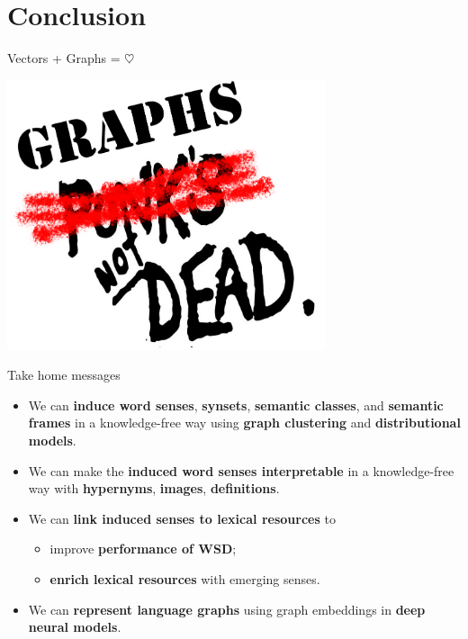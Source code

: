 
\section{Conclusion}


\begin{frame}{Vectors + Graphs = $\heartsuit$ }

\begin{center}
\includegraphics[width=0.7\textwidth]{figures/graphs}	
\end{center}

\end{frame}

\begin{frame}{Take home messages}

\begin{itemize}
	\item We can \alert{\textbf{induce word senses}}, \alert{\textbf{synsets}}, \alert{\textbf{semantic classes}}, and \textbf{\alert{semantic frames}} in a knowledge-free way using \textbf{graph clustering} and \textbf{distributional models}.
    \vspace{1em}
    \pause
    
	\item We can make the \alert{\textbf{induced word senses interpretable}} in a knowledge-free way with \textbf{hypernyms}, \textbf{images},  \textbf{definitions}. 
	\vspace{1em}
    \pause
	
	\item We can \alert{\textbf{link induced senses to lexical resources}} to
	\begin{itemize} 
		\item improve \textbf{performance of WSD};
		\item \textbf{enrich lexical resources} with emerging senses.
	\end{itemize}
	
	\pause 
	\item We can \textbf{\alert{represent language graphs}} using graph embeddings in \textbf{deep neural models}.
	
\end{itemize}


\end{frame}




